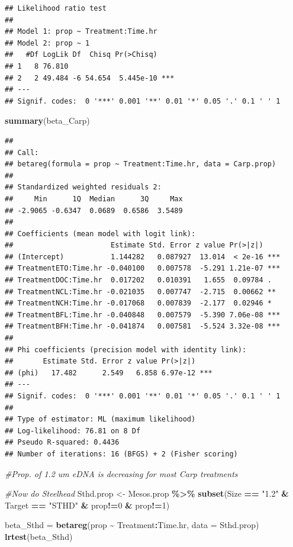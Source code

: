 \documentclass[
]{article}
\newenvironment{Shaded}{\begin{snugshade}}{\end{snugshade}}
\newcommand{\AttributeTok}[1]{\textcolor[rgb]{0.13,0.29,0.53}{#1}}
\newcommand{\CommentTok}[1]{\textcolor[rgb]{0.56,0.35,0.01}{\textit{#1}}}
\newcommand{\DecValTok}[1]{\textcolor[rgb]{0.00,0.00,0.81}{#1}}
\newcommand{\FunctionTok}[1]{\textcolor[rgb]{0.13,0.29,0.53}{\textbf{#1}}}
\newcommand{\NormalTok}[1]{#1}
\newcommand{\OtherTok}[1]{\textcolor[rgb]{0.56,0.35,0.01}{#1}}
\newcommand{\SpecialCharTok}[1]{\textcolor[rgb]{0.81,0.36,0.00}{\textbf{#1}}}
\newcommand{\StringTok}[1]{\textcolor[rgb]{0.31,0.60,0.02}{#1}}
\begin{document}
\begin{verbatim}
## Likelihood ratio test
## 
## Model 1: prop ~ Treatment:Time.hr
## Model 2: prop ~ 1
##   #Df LogLik Df  Chisq Pr(>Chisq)    
## 1   8 76.810                         
## 2   2 49.484 -6 54.654  5.445e-10 ***
## ---
## Signif. codes:  0 '***' 0.001 '**' 0.01 '*' 0.05 '.' 0.1 ' ' 1
\end{verbatim}

\begin{Shaded}
\begin{Highlighting}[]
\FunctionTok{summary}\NormalTok{(beta\_Carp)}
\end{Highlighting}
\end{Shaded}

\begin{verbatim}
## 
## Call:
## betareg(formula = prop ~ Treatment:Time.hr, data = Carp.prop)
## 
## Standardized weighted residuals 2:
##     Min      1Q  Median      3Q     Max 
## -2.9065 -0.6347  0.0689  0.6586  3.5489 
## 
## Coefficients (mean model with logit link):
##                       Estimate Std. Error z value Pr(>|z|)    
## (Intercept)           1.144282   0.087927  13.014  < 2e-16 ***
## TreatmentETO:Time.hr -0.040100   0.007578  -5.291 1.21e-07 ***
## TreatmentDOC:Time.hr  0.017202   0.010391   1.655  0.09784 .  
## TreatmentNCL:Time.hr -0.021035   0.007747  -2.715  0.00662 ** 
## TreatmentNCH:Time.hr -0.017068   0.007839  -2.177  0.02946 *  
## TreatmentBFL:Time.hr -0.040848   0.007579  -5.390 7.06e-08 ***
## TreatmentBFH:Time.hr -0.041874   0.007581  -5.524 3.32e-08 ***
## 
## Phi coefficients (precision model with identity link):
##       Estimate Std. Error z value Pr(>|z|)    
## (phi)   17.482      2.549   6.858 6.97e-12 ***
## ---
## Signif. codes:  0 '***' 0.001 '**' 0.01 '*' 0.05 '.' 0.1 ' ' 1 
## 
## Type of estimator: ML (maximum likelihood)
## Log-likelihood: 76.81 on 8 Df
## Pseudo R-squared: 0.4436
## Number of iterations: 16 (BFGS) + 2 (Fisher scoring)
\end{verbatim}

\begin{Shaded}
\begin{Highlighting}[]
\CommentTok{\#Prop. of 1.2 um eDNA is decreasing for most Carp treatments}

\CommentTok{\#Now do Steelhead}
\NormalTok{Sthd.prop }\OtherTok{\textless{}{-}}\NormalTok{ Mesos.prop }\SpecialCharTok{\%\textgreater{}\%} 
  \FunctionTok{subset}\NormalTok{(Size }\SpecialCharTok{==} \StringTok{"1.2"} \SpecialCharTok{\&}\NormalTok{ Target }\SpecialCharTok{==} \StringTok{"STHD"} \SpecialCharTok{\&}\NormalTok{ prop}\SpecialCharTok{!=}\DecValTok{0} \SpecialCharTok{\&}\NormalTok{ prop}\SpecialCharTok{!=}\DecValTok{1}\NormalTok{)}

\NormalTok{beta\_Sthd }\OtherTok{=} \FunctionTok{betareg}\NormalTok{(prop }\SpecialCharTok{\textasciitilde{}}\NormalTok{ Treatment}\SpecialCharTok{:}\NormalTok{Time.hr, }\AttributeTok{data =}\NormalTok{ Sthd.prop)}
\FunctionTok{lrtest}\NormalTok{(beta\_Sthd)}
\end{Highlighting}
\end{Shaded}
\end{document}
